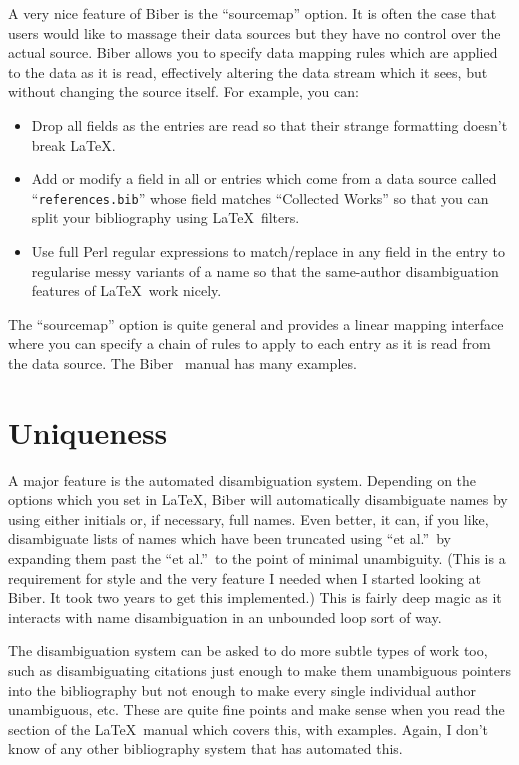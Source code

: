\documentclass[final]{ltugboat}
\def\BibLaTeX{\Bib\LaTeX}
\begin{document}
A very nice feature of Biber is the ``sourcemap'' option. It is often the
case that users would like to massage their data sources but they
have no control over the actual source. Biber allows you to 
specify data mapping rules which are applied to the data as it is read,
effectively altering the data stream which it sees, but without changing
the source itself. For example, you can:

\begin{itemize}
\item Drop all  fields as the entries are read so that their strange
 formatting doesn't break \LaTeX.
\item Add or modify a  field in all  or 
 entries which come from a data source called ``\nolinkurl{references.bib}'' whose
  field matches ``Collected Works'' so that you can split your
 bibliography using \BibLaTeX\ filters.
\item Use full Perl regular expressions to match\slash replace in any field in
 the entry to regularise messy variants of a name so that the same-author
 disambiguation features of \BibLaTeX\ work nicely.
\end{itemize}

\noindent The ``sourcemap'' option is quite general and provides a
linear mapping interface where you can specify a chain of rules to
apply to each entry as it is read from the data source. The Biber
\PDF\ manual has many examples. 

\section{Uniqueness}

A major feature is the automated disambiguation system. Depending on the
options which you set in \BibLaTeX, Biber will automatically disambiguate
names by using either initials or, if necessary, full names. Even better,
it can, if you like, disambiguate lists of names which have been truncated using
``et al.''\ by expanding them past the ``et al.''\ to the point of minimal
unambiguity.  (This is a requirement for  style and the very feature I
needed when I started looking at Biber. It took two years to get this
implemented.) This is fairly deep magic as it interacts with name
disambiguation in an unbounded loop sort of way.

The disambiguation system can be asked to do more subtle types of work
too, such as
disambiguating citations just enough to make them unambiguous pointers into
the bibliography but not enough to make every single individual author
unambiguous, etc. These are quite fine points and make sense when you read
the section of the \BibLaTeX\ manual which covers this, with examples.
Again, I don't know of any other bibliography system that has automated
this.
\end{document}
